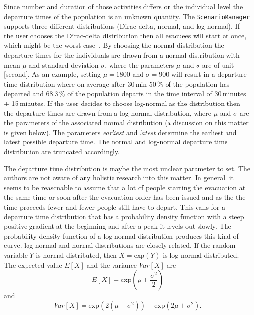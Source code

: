 \begin{compactitem}
Since number and duration of those activities differs on the individual level the departure times of the population is an unknown quantity. The \lstinline|ScenarioManager| supports three different distributions (Dirac-delta, normal, and log-normal). If the user chooses the Dirac-delta distribution then all evacuees will start at once, which might be the worst case~\citep{LaemmelKluepfel2012InfluenceOfDepartureTimeDistribution}. By choosing the normal distribution the departure times for the individuals are drawn from a normal distribution with mean $\mu$ and standard deviation $\sigma$, where the parameters $\mu$ and $\sigma$ are of unit [second]. As an example, setting $\mu = 1800$ and $\sigma =  900$ will result in a departure time distribution where on average after 30\,min 50\,\% of the population has departed and 68.3\,\% of the population departs in the time interval of 30\,minutes $\pm$ 15\,minutes. If the user decides to choose log-normal as the distribution then the departure times are drawn from a log-normal distribution, where $\mu$ and $\sigma$ are the parameters of the associated normal distribution (a discussion on this matter is given below). The parameters \emph{earliest} and \emph{latest} determine the earliest and latest possible departure time. The normal and log-normal departure time distribution are truncated accordingly.
\end{compactitem}
%
The departure time distribution is maybe the most unclear parameter to set. The authors are not aware of any holistic research into this matter. 
In general, it seems to be reasonable to assume that a lot of people starting the evacuation at the same time or soon after the evacuation order has been issued and as the the time proceeds fewer and fewer people still have to depart. 
This calls for a departure time distribution that has a probability density function with a steep positive gradient at the beginning and after a peak it levels out slowly. The probability density function of a log-normal distribution produces this kind of curve. log-normal and normal distributions are closely related. If the random variable $Y$ is normal distributed, then $X = \text{exp}(Y)$ is log-normal distributed. The expected value $E[X]$  and the variance $Var[X]$ are
\begin{equation}
E[X] = \text{exp}(\mu + \frac{\sigma^2}{2})
\end{equation}
and 
\begin{equation}
Var[X]=\text{exp}(2(\mu+\sigma^2))-\text{exp}(2\mu+\sigma^2).
\end{equation}
